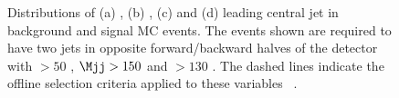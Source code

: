 \begin{figure}
  \caption{Distributions of (a) \Mjj, (b) \detajj, (c) \dphijj and (d) leading central jet \pt in background and signal \ac{MC} events. The events shown are required to have two jets in opposite forward/backward halves of the detector with \pt$>50$ \GeV, $\Mjj>150$ \GeV and \MET$>130$ \GeV. The dashed lines indicate the offline selection criteria applied to these variables ~\cite{Chatrchyan:2014tja}.}
  \label{fig:promptcontrolplots}
\end{figure}


